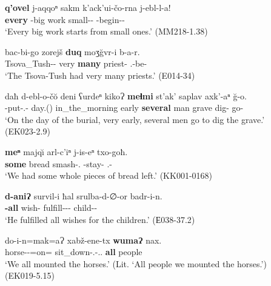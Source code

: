\begin{exe}
	\ex\label{simplenp-ex7}
	\begin{xlist}
		
		\ex\label{simplenp-ex7a}
		\gll \textbf{q'ovel} j-aqqoⁿ sakm k'ack'ui-čo-rna j-ebl-l-a! \\
		\textbf{every} {\J}-big work small-{\Obl}-{\Abl} {\J}-begin-{\Intr}-{\Npst} \\
		\trans `Every big work starts from small ones.'
		\hfill (MM218-1.38)
		
		\ex\label{simplenp-ex7b}
		\gll bac-bi-go zorejš \textbf{duq} moʒ\u{g}vr-i b-a-r. \\
		Tsova\_Tush-{\Pl}-{\Adess} very \textbf{many} priest-{\Pl} {\M}.{\Pl}-be-{{\Imprf}} \\
		\trans `The Tsova-Tush had very many priests.'
		\hfill (E014-34)
		
		\ex\label{simplenp-ex7c}
		\gll daħ d-ebl-o-č\u{o} deni ʕurdeⁿ kikoɁ \textbf{meɬmi} st'ak' saplav axk'-aⁿ \u{g}-o. \\
		{\Pv} {\D}-put-{\Ptcp}.{\Npst}-{\Obl} day.{\Obl}({\Ess}) in\_the\_morning early \textbf{several} man grave dig-{\Inf} go-{\Npst} \\
		\trans `On the day of the burial, very early, several men go to dig the grave.' \\
		\hfill (EK023-2.9)
		
		\ex\label{simplenp-ex7d}
		\gll \textbf{meⁿ} majq\u{\i} arl-c'iⁿ j-is-eⁿ txo-goħ. \\
		\textbf{some} bread smash-{\Priv}.{\Adjz} {\J}-stay-{\Aor} {\Fpl}.{\Excl}-{\Adess} \\
		\trans `We had some whole pieces of bread left.'
		\hfill (KK001-0168)
		
		
		
		\ex\label{simplenp-ex7e}
		\gll \textbf{d-aniɁ} survil-i ħal srulba-d-∅-or badr-i-n. \\
		\textbf{{\D}-all} wish-{\Pl} {\Pv} fulfill-{\D}-{\Tr}-{{\Imprf}} child-{\Pl}-{\Dat} \\
		\trans `He fulfilled all wishes for the children.'
		\hfill (Е038-37.2)
		
		\ex\label{simplenp-ex7f}
		\gll do-i-n=mak=aɁ xabž-ene-tx \textbf{wumaɁ} nax. \\
		horse-{\Pl}-{\Dat}=on={\Emph} sit\_down-{\Aor}.{\Seq}-{\Fpl}.{\Excl}.{\Erg} \textbf{all} people \\
		\trans `We all mounted the horses.' (Lit. `All people we mounted the horses.') \\
		\hfill (EK019-5.15)
		
	\end{xlist}
\end{exe}

